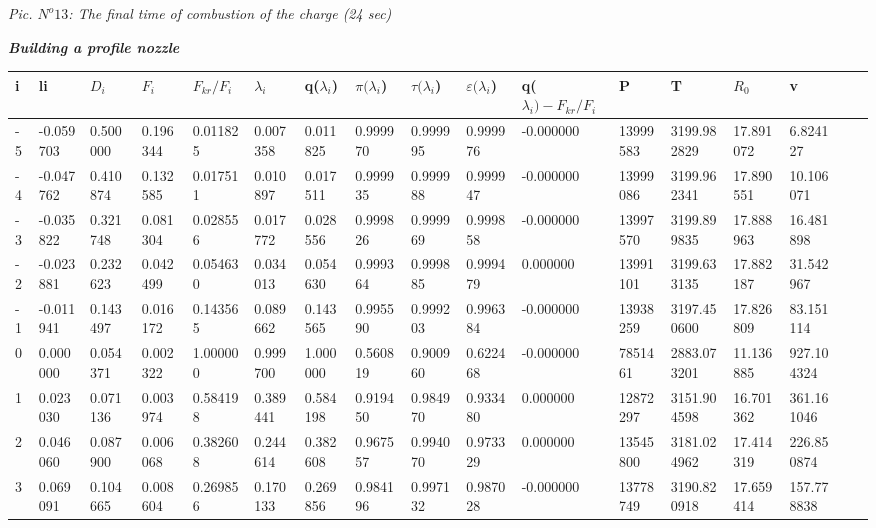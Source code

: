 \begin{flushright}
\textit{ Pic. $N^o 13$: The final time of combustion of the charge (24 sec) } \\
\end{flushright}
\newpage

\begin{center}
\begin{large}
\textbf{\textit { Building a profile nozzle }} \\
\end{large}
\end{center}
\begin{center}
\begin{tabular}{|l*{16}{l|}}
\hline
i & li & \(D_i\) & \(F_i\) & \(F_{kr}/F_i\) & $\lambda_i$ & q($\lambda_i$) & $\pi(\lambda_i$) & $\tau(\lambda_i$) & $\varepsilon(\lambda_i$) & q($\lambda_i) - F_{kr}/F_i$ & P & T & \(R_0\) & v  \\
\hline
-5 & -0.059703 & 0.500000 & 0.196344 & 0.011825 & 0.007358 & 0.011825 & 0.999970 & 0.999995 & 0.999976 & -0.000000 & 13999583 & 3199.982829 & 17.891072 & 6.824127 \\
-4 & -0.047762 & 0.410874 & 0.132585 & 0.017511 & 0.010897 & 0.017511 & 0.999935 & 0.999988 & 0.999947 & -0.000000 & 13999086 & 3199.962341 & 17.890551 & 10.106071 \\
-3 & -0.035822 & 0.321748 & 0.081304 & 0.028556 & 0.017772 & 0.028556 & 0.999826 & 0.999969 & 0.999858 & -0.000000 & 13997570 & 3199.899835 & 17.888963 & 16.481898 \\
-2 & -0.023881 & 0.232623 & 0.042499 & 0.054630 & 0.034013 & 0.054630 & 0.999364 & 0.999885 & 0.999479 & 0.000000 & 13991101 & 3199.633135 & 17.882187 & 31.542967 \\
-1 & -0.011941 & 0.143497 & 0.016172 & 0.143565 & 0.089662 & 0.143565 & 0.995590 & 0.999203 & 0.996384 & -0.000000 & 13938259 & 3197.450600 & 17.826809 & 83.151114 \\
0 & 0.000000 & 0.054371 & 0.002322 & 1.000000 & 0.999700 & 1.000000 & 0.560819 & 0.900960 & 0.622468 & -0.000000 & 7851461 & 2883.073201 & 11.136885 & 927.104324 \\
1 & 0.023030 & 0.071136 & 0.003974 & 0.584198 & 0.389441 & 0.584198 & 0.919450 & 0.984970 & 0.933480 & 0.000000 & 12872297 & 3151.904598 & 16.701362 & 361.161046 \\
2 & 0.046060 & 0.087900 & 0.006068 & 0.382608 & 0.244614 & 0.382608 & 0.967557 & 0.994070 & 0.973329 & 0.000000 & 13545800 & 3181.024962 & 17.414319 & 226.850874 \\
3 & 0.069091 & 0.104665 & 0.008604 & 0.269856 & 0.170133 & 0.269856 & 0.984196 & 0.997132 & 0.987028 & -0.000000 & 13778749 & 3190.820918 & 17.659414 & 157.778838 \\

\end{tabular}
\end{center}
